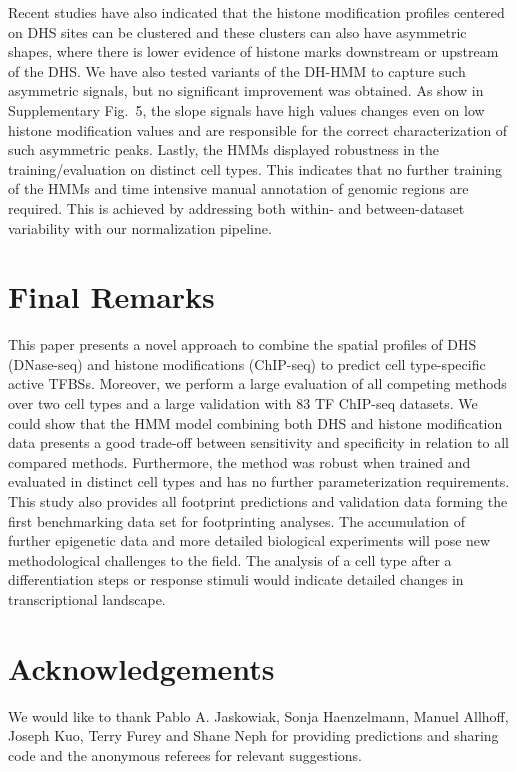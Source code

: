\documentclass{bioinfo}
\begin{document}
Recent studies have also indicated that the histone modification profiles centered on DHS
sites can be clustered and these clusters can also have asymmetric shapes,
where there is lower evidence of histone marks downstream or upstream of the DHS.
We have also tested variants of the DH-HMM to capture such asymmetric signals,
but no significant improvement was obtained. As show in Supplementary Fig.~5,
the slope signals have high values changes even on low histone modification values and are
responsible for the correct characterization of such asymmetric peaks. Lastly,
the HMMs displayed robustness in the training/evaluation on distinct cell types.
This indicates that no further training of the HMMs and time intensive manual
annotation of genomic regions are required. This is achieved by addressing both
within- and between-dataset variability with our normalization pipeline.

\section{Final Remarks}
\label{sec:final.remarks}

This paper presents a novel approach to combine the spatial profiles of DHS (DNase-seq)
and histone modifications (ChIP-seq) to predict cell type-specific active TFBSs.
Moreover, we perform a large evaluation of all competing methods over two cell
types and a large validation with 83 TF ChIP-seq datasets. We could show that
the HMM model combining both DHS and histone modification data presents a good
trade-off between sensitivity and specificity in relation to all compared methods.
Furthermore, the method was robust when trained and evaluated in distinct cell
types and has no further parameterization requirements. This study also provides
all footprint predictions and validation data forming the first benchmarking data
set for footprinting analyses. The accumulation of further epigenetic data
and more detailed biological experiments will pose new methodological challenges
to the field. The analysis of a cell type after a differentiation steps or response
stimuli would indicate detailed changes in transcriptional landscape. 

\section*{Acknowledgements}

We would like to thank Pablo A. Jaskowiak, Sonja Haenzelmann, Manuel Allhoff, {\color{red}Joseph Kuo,}
Terry Furey and Shane Neph for providing predictions and sharing code and
the anonymous referees for relevant suggestions.
\end{document}
